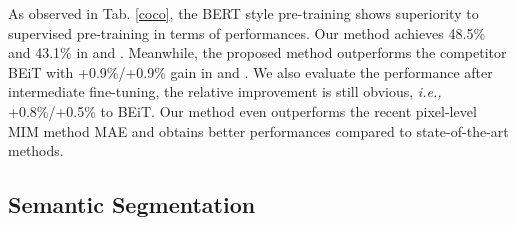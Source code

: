 \documentclass[runningheads]{llncs}
\begin{document}
\begin{table}[h]
\small
\centering
\caption{Experiment results of object detection and instance segmentation on COCO. We follow the implementation of \cite{benchmarking,mimdet} and the model is trained for 25 epochs. Intermediate fine-tuning denotes the model is further fine-tuned on ImageNet-1K. 
}
\label{coco}
\end{table}



As observed in Tab. \ref{coco}, the BERT style pre-training shows superiority to supervised pre-training in terms of performances. Our method achieves 48.5\% and 43.1\% in  and . Meanwhile, the proposed method outperforms the competitor BEiT with +0.9\%/+0.9\%  gain in  and . We also evaluate the performance after intermediate fine-tuning, the relative improvement is still obvious, \textit{i.e.,} +0.8\%/+0.5\% to BEiT. Our method even outperforms the recent pixel-level MIM method MAE and obtains better performances compared to state-of-the-art methods.



\subsection{Semantic Segmentation}
\end{document}
